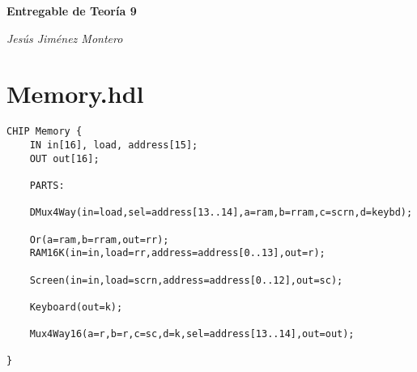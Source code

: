 \documentclass[12pt]{article}
\begin{document}
\nocite{namesans_about}
\nocite{namesans}
\nocite{namemono}


	\begin{titlepage}
		\begin{center}
			{\Huge \textbf{Entregable de Teoría 9}}

			\vspace{2cm}

			{\Large \textit{Jesús Jiménez Montero}}

			\vspace{2cm}
		\end{center}
	\end{titlepage}

	\newpage
	\renewcommand{\contentsname}{Tabla de contenidos}
	\setcounter{secnumdepth}{5}
	\tableofcontents
	\setcounter{tocdepth}{4}
	\newpage

	\section{Memory.hdl}
	\begin{lstlisting}
CHIP Memory {
	IN in[16], load, address[15];
	OUT out[16];

	PARTS:

	DMux4Way(in=load,sel=address[13..14],a=ram,b=rram,c=scrn,d=keybd);

	Or(a=ram,b=rram,out=rr);
	RAM16K(in=in,load=rr,address=address[0..13],out=r);

	Screen(in=in,load=scrn,address=address[0..12],out=sc);

	Keyboard(out=k);

	Mux4Way16(a=r,b=r,c=sc,d=k,sel=address[13..14],out=out);

}
	\end{lstlisting}

\newpage

\printbibliography[title={Biliografía y agradecimientos}]
\end{document}
